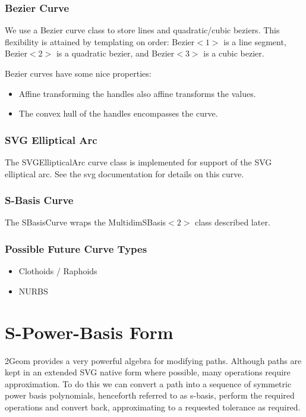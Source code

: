 \documentclass[openany]{book}
\newcommand{\code}[1]{\textsf{#1}}
\begin{document}
\subsection{Bezier Curve}
We use a \code{Bezier} curve class to store lines and quadratic/cubic
beziers.  This flexibility is attained by templating on order:
\code{Bezier$<1>$} is a line segment, \code{Bezier$<2>$} is a quadratic
bezier, and \code{Bezier$<3>$} is a cubic bezier.

Bezier curves have some nice properties:
\begin{itemize}
\item Affine transforming the handles also affine transforms the values.
\item The convex hull of the handles encompasses the curve.
\end{itemize}

\subsection{SVG Elliptical Arc}
The \code{SVGEllipticalArc} curve class is implemented for support of
the SVG elliptical arc.  See the svg documentation for details on this
curve.

\subsection{S-Basis Curve}
The \code{SBasisCurve} wraps the \code{MultidimSBasis$<2>$} class
described later.

\subsection{Possible Future Curve Types}
\begin{itemize}
\item Clothoids / Raphoids
\item NURBS
\end{itemize}

\chapter{S-Power-Basis Form}

2Geom provides a very powerful algebra for modifying paths.  Although
paths are kept in an extended SVG native form where possible, many
operations require approximation.  To do this we can convert a path
into a sequence of symmetric power basis polynomials, henceforth
referred to as s-basis, perform the required operations and convert
back, approximating to a requested tolerance as required.
\end{document}
